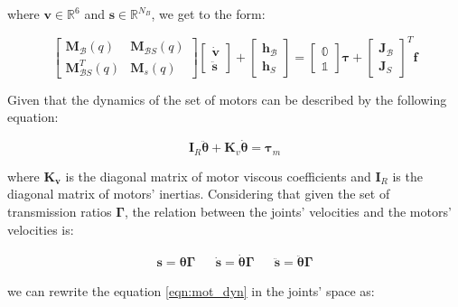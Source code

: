 where $\mathrm{\mathbf{v}} \in \mathbb{R} ^{6}$ and $\mathbf{s} \in \mathbb{R}^{N_B}$, we get to the form:

\begin{equation}
    \begin{bmatrix}
        \mathbf{M} _{\mathcal{B}}(q)     & \mathbf{M} _{\mathcal{B}S}(q) \\
        \mathbf{M} _{\mathcal{B}S} ^T(q) & \mathbf{M} _s(q)
    \end{bmatrix}
    \begin{bmatrix}
        \dot{\mathrm{\mathbf{v}}} \\
        \ddot{\mathbf{s}}
    \end{bmatrix}+
    \begin{bmatrix}
        \mathbf{h} _{\mathcal{B}} \\
        \mathbf{h} _S
    \end{bmatrix}=
    \begin{bmatrix}
        \mathbb{0} \\
        \mathbb{1}
    \end{bmatrix}
    \boldsymbol{\tau}
    +
    \begin{bmatrix}
        \mathbf{J} _{\mathcal{B}} \\
        \mathbf{J} _S
    \end{bmatrix} ^T
    \mathbf{f}
\end{equation}

Given that the dynamics of the set of motors can be described by the following equation:

\begin{equation}
    \label{eqn:mot_dyn}
    \mathbf{I} _R \ddot{\boldsymbol{\theta}} + \mathbf{K}_v \dot{\boldsymbol{\theta}} = \boldsymbol{\tau}_m
\end{equation}

where $\mathbf{K _v}$ is the diagonal matrix of motor viscous coefficients and $\mathbf{I}_R$ is the diagonal matrix of motors' inertias. Considering that given the set of transmission ratios $\boldsymbol{\Gamma}$, the relation between the joints' velocities and the motors' velocities is:

\begin{align}
    \mathbf{s} = \boldsymbol{\theta} \boldsymbol{\Gamma} &  & \dot{\mathbf{s}} = \dot{\boldsymbol{\theta}} \boldsymbol{\Gamma} &  & \ddot{\mathbf{s}} = \ddot{\boldsymbol{\theta}} \boldsymbol{\Gamma}
\end{align}

we can rewrite the equation \ref{eqn:mot_dyn} in the joints' space as:

